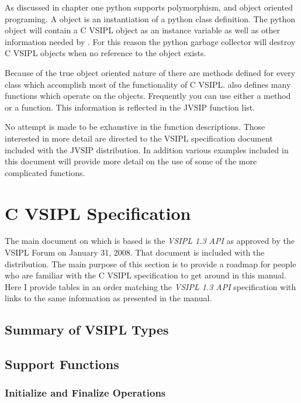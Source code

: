 As discussed in chapter one python supports polymorphism, and object oriented programing. A \pyjv object is an instantiation of a python class definition. The python object will contain a C VSIPL object as an instance variable as well as other information needed by \pyjv. For this reason the python garbage collector will destroy C VSIPL objects when no reference to the \pyjv object exists.

Because of the true object oriented nature of \pyjv there are methods defined for every class which accomplish most of the functionality of C VSIPL.  also defines many functions which operate on the \pyjv objects. Frequently you can use either a method or a function. This information is reflected in the JVSIP function list.

No attempt is made to be exhaustive in the function descriptions. Those interested in more detail are directed to the VSIPL specification document included with the JVSIP distribution. In addition various examples included in this document will provide more detail on the use of some of the more complicated functions.
%
\section*{C VSIPL Specification}
The main document on which  is based is the \emph{VSIPL 1.3 API} as approved by the VSIPL Forum on January 31, 2008.  That document is included with the  distribution.  The main purpose of this section is to provide a roadmap for people who are familiar with the C VSIPL specification to get around in this  manual.  Here I provide tables in an order matching the \emph{VSIPL 1.3 API} specification with links to the same information as presented  in the  manual.
\subsection*{Summary of VSIPL Types}
\subsection*{Support Functions}

\subsubsection*{Initialize and Finalize Operations}
